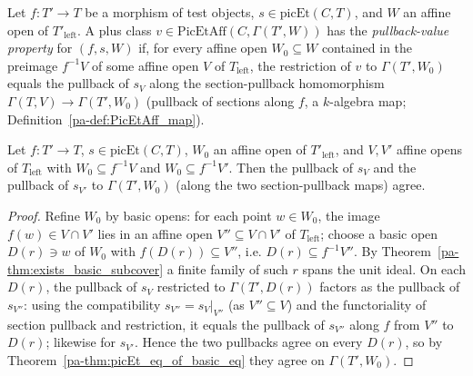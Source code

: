 \begin{definition}
  \label{pa-def:picEt_IsPullbackValue}
  \leanok

  Let \(f \colon T' \to T\) be a morphism of test objects, \(s \in \mathrm{picEt}(C, T)\), and
  \(W\) an affine open of \(T'_{\mathrm{left}}\). A plus class \(v \in \mathrm{PicEtAff}(C,
  \Gamma(T', W))\) has the \emph{pullback-value property} for \((f, s, W)\) if, for every affine
  open \(W_0 \subseteq W\) contained in the preimage \(f^{-1}V\) of some affine open \(V\) of
  \(T_{\mathrm{left}}\), the restriction of \(v\) to \(\Gamma(T', W_0)\) equals the pullback of
  \(s_V\) along the section-pullback homomorphism \(\Gamma(T, V) \to \Gamma(T', W_0)\) (pullback of
  sections along \(f\), a \(k\)-algebra map; Definition~\ref{pa-def:PicEtAff_map}).
\end{definition}

\begin{theorem}
  \label{pa-thm:picEt_mapAlg_appLE_eq}
  \leanok

  Let \(f \colon T' \to T\), \(s \in \mathrm{picEt}(C, T)\), \(W_0\) an affine open of
  \(T'_{\mathrm{left}}\), and \(V, V'\) affine opens of \(T_{\mathrm{left}}\) with \(W_0 \subseteq
  f^{-1}V\) and \(W_0 \subseteq f^{-1}V'\). Then the pullback of \(s_V\) and the pullback of
  \(s_{V'}\) to \(\Gamma(T', W_0)\) (along the two section-pullback maps) agree.
\end{theorem}
\begin{proof}
  \leanok
  Refine \(W_0\) by basic opens: for each point \(w \in W_0\), the image \(f(w) \in V \cap V'\) lies
  in an affine open \(V'' \subseteq V \cap V'\) of \(T_{\mathrm{left}}\); choose a basic open
  \(D(r) \ni w\) of \(W_0\) with \(f(D(r)) \subseteq V''\), i.e. \(D(r) \subseteq f^{-1}V''\). By
  Theorem~\ref{pa-thm:exists_basic_subcover} a finite family of such \(r\) spans the unit ideal. On
  each \(D(r)\), the pullback of \(s_V\) restricted to \(\Gamma(T', D(r))\) factors as the pullback
  of \(s_{V''}\): using the compatibility \(s_{V''} = s_V|_{V''}\) (as \(V'' \subseteq V\)) and the
  functoriality of section pullback and restriction, it equals the pullback of \(s_{V''}\) along
  \(f\) from \(V''\) to \(D(r)\); likewise for \(s_{V'}\). Hence the two pullbacks agree on every
  \(D(r)\), so by Theorem~\ref{pa-thm:picEt_eq_of_basic_eq} they agree on \(\Gamma(T', W_0)\).
\end{proof}

